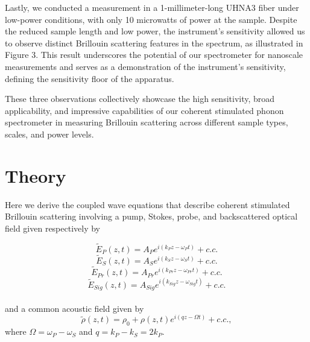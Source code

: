 \documentclass[pdflatex,iicol]{sn-jnl}%
\begin{document}
Lastly, we conducted a measurement in a 1-millimeter-long UHNA3 fiber under low-power conditions, with only 10 microwatts of power at the sample. Despite the reduced sample length and low power, the instrument's sensitivity allowed us to observe distinct Brillouin scattering features in the spectrum, as illustrated in Figure 3. This result underscores the potential of our spectrometer for nanoscale measurements and serves as a demonstration of the instrument's sensitivity, defining the sensitivity floor of the apparatus.

These three observations collectively showcase the high sensitivity, broad applicability, and impressive capabilities of our coherent stimulated phonon spectrometer in measuring Brillouin scattering across different sample types, scales, and power levels.

\section{Theory}\label{Theory}

Here we derive the coupled wave equations that describe coherent stimulated Brillouin scattering involving a pump, Stokes, probe, and backscattered optical field given respectively by

\begin{equation}
    \tilde{E}_{P}(z,t) = A_{P}e^{i(k_{P}z - \omega_{P}t)} + c.c.
    \label{Pump optical field}
\end{equation}
\begin{equation}
    \tilde{E}_{S}(z,t) = A_{S}e^{i(k_{S}z - \omega_{S}t)} + c.c.
    \label{Stokes optical field}
\end{equation}
\begin{equation}
    \tilde{E}_{Pr}(z,t) = A_{Pr}e^{i(k_{Pr}z - \omega_{Pr}t)} + c.c.
    \label{Probe optical field}
\end{equation}
\begin{equation}
    \tilde{E}_{Sig}(z,t) = A_{Sig}e^{i(k_{Sig}z - \omega_{Sig}t)} + c.c.
    \label{Signal optical field}
\end{equation}
\\
\noindent and a common acoustic field given by
\begin{equation}
    \tilde{\rho}(z,t) = \rho_{0} + \rho(z,t)e^{i(qz - \Omega t)} + c.c.,
    \label{acoustic field}
\end{equation}
\noindent where $\Omega = \omega_{P} - \omega_{S}$ and $q = k_{P} - k_{S} = 2k_{P}$.
\end{document}
